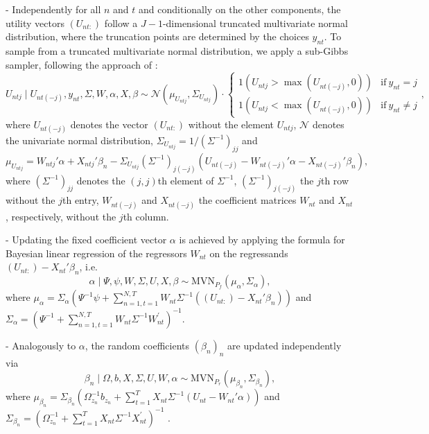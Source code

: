 \documentclass[article]{jss}
\begin{document}
- Independently for all $n$ and $t$ and conditionally on the other components, the utility vectors $(U_{nt:})$ follow a $J-1$-dimensional truncated multivariate normal distribution, where the truncation points are determined by the choices $y_{nt}$. To sample from a truncated multivariate normal distribution, we apply a sub-Gibbs sampler, following the approach of \cite{Geweke:1998}:
\begin{equation}
U_{ntj} \mid U_{nt(-j)},y_{nt},\Sigma,W,\alpha,X,\beta
\sim \mathcal{N}(\mu_{U_{ntj}},\Sigma_{U_{ntj}}) \cdot \begin{cases}
1(U_{ntj}>\max(U_{nt(-j)},0) ) & \text{if}~ y_{nt}=j\\
1(U_{ntj}<\max(U_{nt(-j)},0) ) & \text{if}~ y_{nt}\neq j
\end{cases},
\end{equation}
where $U_{nt(-j)}$ denotes the vector $(U_{nt:})$ without the element $U_{ntj}$, $\mathcal{N}$ denotes the univariate normal distribution, $\Sigma_{U_{ntj}} = 1/(\Sigma^{-1})_{jj}$ and
\begin{equation}
\mu_{U_{ntj}} = W_{ntj}'\alpha + X_{ntj}'\beta_n - \Sigma_{U_{ntj}} (\Sigma^{-1})_{j(-j)}   (U_{nt(-j)} - W_{nt(-j)}'\alpha - X_{nt(-j)}' \beta_n ),
\end{equation}
where $(\Sigma^{-1})_{jj}$ denotes the $(j,j)$th element of $\Sigma^{-1}$, $(\Sigma^{-1})_{j(-j)}$ the $j$th row without the $j$th entry, $W_{nt(-j)}$ and $X_{nt(-j)}$ the coefficient matrices $W_{nt}$ and $X_{nt}$, respectively, without the $j$th column.

- Updating the fixed coefficient vector $\alpha$ is achieved by applying the formula for Bayesian linear regression of the regressors $W_{nt}$ on the regressands $(U_{nt:})-X_{nt}'\beta_n$, i.e.
\begin{equation}
\alpha \mid \Psi,\psi,W,\Sigma,U,X,\beta \sim \text{MVN}_{P_f}(\mu_\alpha,\Sigma_\alpha),
\end{equation}
where $\mu_\alpha = \Sigma_\alpha (\Psi^{-1}\psi + \sum_{n=1,t=1}^{N,T} W_{nt} \Sigma^{-1} ((U_{nt:})-X_{nt}'\beta_n) )$ and $\Sigma_\alpha = (\Psi^{-1} + \sum_{n=1,t=1}^{N,T} W_{nt}\Sigma^{-1} W_{nt}^{'} )^{-1}$.

- Analogously to $\alpha$, the random coefficients $(\beta_n)_n$ are updated independently via
\begin{equation}
\beta_n \mid \Omega,b,X,\Sigma,U,W,\alpha \sim \text{MVN}_{P_r}(\mu_{\beta_n},\Sigma_{\beta_n}),
\end{equation}
where $\mu_{\beta_n} = \Sigma_{\beta_n} (\Omega_{z_n}^{-1}b_{z_n} + \sum_{t=1}^{T} X_{nt} \Sigma^{-1} (U_{nt}-W_{nt}'\alpha) )$ and $\Sigma_{\beta_n} = (\Omega_{z_n}^{-1} + \sum_{t=1}^{T} X_{nt}\Sigma^{-1} X_{nt}^{'} )^{-1}$ .
\end{document}
